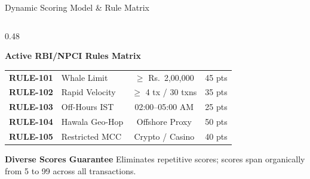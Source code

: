 \documentclass[aspectratio=169,10pt]{beamer}
\begin{document}
\begin{frame}{Dynamic Scoring Model \& Rule Matrix}
\begin{columns}[t]
\begin{column}{0.48\textwidth}
\begin{exampleblock}{\textbf{Active RBI/NPCI Rules Matrix}}
\begin{tabular}{llcc}
          \textbf{RULE-101} & Whale Limit & $\ge$ Rs.~2,00,000 & 45 pts \\
          \textbf{RULE-102} & Rapid Velocity & $\ge$ 4 tx / 30 txns & 35 pts \\
          \textbf{RULE-103} & Off-Hours IST & 02:00--05:00 AM & 25 pts \\
          \textbf{RULE-104} & Hawala Geo-Hop & Offshore Proxy & 50 pts \\
          \textbf{RULE-105} & Restricted MCC & Crypto / Casino & 40 pts \\
          \bottomrule
        \end{tabular}
      \end{exampleblock}
      \vspace{0.2em}
      \begin{alertblock}{\textbf{Diverse Scores Guarantee}}
        \footnotesize Eliminates repetitive scores; scores span organically from 5 to 99 across all transactions.
      \end{alertblock}
    \end{column}
  \end{columns}
\end{frame}
\end{document}
